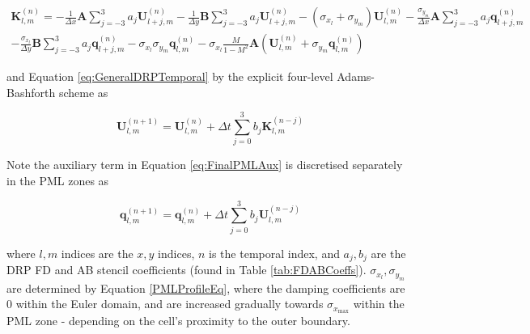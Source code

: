 \begin{equation} \label{eq:PMLDRP}
\begin{split}
    \mathbf{K}^{\left(n\right)}_{l,m} = - \frac{1}{\Delta x} \mathbf{A} \sum^3_{j=-3} a_j \mathbf{U}^{\left(n\right)}_{l+j,m} - \frac{1}{\Delta y} \mathbf{B} \sum^3_{j=-3} a_j \mathbf{U}^{\left(n\right)}_{l+j,m} - \left(\sigma_{x_{l}} + \sigma_{y_{m}} \right) \mathbf{U}^{\left( n \right)}_{l,m} - \frac{\sigma_{y_{m}}}{\Delta x} \mathbf{A} \sum^3_{j=-3} a_j \mathbf{q}^{\left(n\right)}_{l+j,m} \\ - \frac{\sigma_{x_{l}}}{\Delta y} \mathbf{B} \sum^3_{j=-3} a_j \mathbf{q}^{\left(n\right)}_{l+j,m} - \sigma_{x_{l}}\sigma_{y_{m}}\mathbf{q}^{\left(n\right)}_{l,m} - \sigma_{x_l}\frac{M}{1-M^2}\mathbf{A} \left(\mathbf{U}^{\left( n \right)}_{l,m} + \sigma_{y_m}\mathbf{q}^{\left(n\right)}_{l,m} \right)
    \end{split}
\end{equation}

 and Equation \ref{eq:GeneralDRPTemporal} by the explicit four-level Adams-Bashforth scheme as
 
\begin{equation} \label{eq:PMLDRPTemporal}
    \mathbf{U}^{\left(n+1\right)}_{l,m} = \mathbf{U}^{\left(n\right)}_{l,m} + \Delta t \sum^3_{j=0} b_j \mathbf{K}^{\left(n-j\right)}_{l,m}
\end{equation}

Note the auxiliary term in Equation \ref{eq:FinalPMLAux} is discretised separately in the PML zones as

\begin{equation}
    \mathbf{q}^{\left(n+1\right)}_{l,m} = \mathbf{q}^{\left(n\right)}_{l,m} + \Delta t \sum^3_{j=0} b_j \mathbf{U}^{\left(n-j\right)}_{l,m}
\end{equation}


where $l,m$ indices are the $x,y$ indices, $n$ is the temporal index, and $a_j,b_j$ are the DRP FD and AB stencil coefficients (found in Table \ref{tab:FDABCoeffs}). $\sigma_{x_l}, \sigma_{y_m}$ are determined by Equation \ref{PMLProfileEq}, where the damping coefficients are $0$ within the Euler domain, and are increased gradually towards $\sigma_{x_{\mathrm{max}}}$ within the PML zone - depending on the cell's proximity to the outer boundary.


